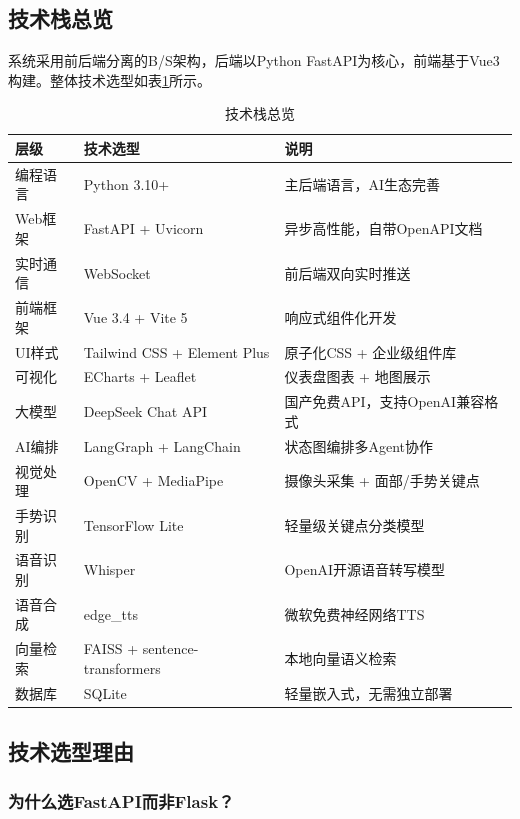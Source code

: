 \documentclass[a4paper]{article}
\begin{document}
\subsection{技术栈总览}

系统采用前后端分离的B/S架构，后端以Python FastAPI为核心，前端基于Vue3构建。整体技术选型如表\ref{tab:techstack}所示。

\begin{table}[H]
  \centering
  \caption{技术栈总览}
  \label{tab:techstack}
  \begin{tabular}{lll}
  \toprule
  层级 & 技术选型 & 说明 \\
  \midrule
  编程语言 & Python 3.10+ & 主后端语言，AI生态完善 \\
  Web框架 & FastAPI + Uvicorn & 异步高性能，自带OpenAPI文档 \\
  实时通信 & WebSocket & 前后端双向实时推送 \\
  前端框架 & Vue 3.4 + Vite 5 & 响应式组件化开发 \\
  UI样式 & Tailwind CSS + Element Plus & 原子化CSS + 企业级组件库 \\
  可视化 & ECharts + Leaflet & 仪表盘图表 + 地图展示 \\
  大模型 & DeepSeek Chat API & 国产免费API，支持OpenAI兼容格式 \\
  AI编排 & LangGraph + LangChain & 状态图编排多Agent协作 \\
  视觉处理 & OpenCV + MediaPipe & 摄像头采集 + 面部/手势关键点 \\
  手势识别 & TensorFlow Lite & 轻量级关键点分类模型 \\
  语音识别 & Whisper & OpenAI开源语音转写模型 \\
  语音合成 & edge\_tts & 微软免费神经网络TTS \\
  向量检索 & FAISS + sentence-transformers & 本地向量语义检索 \\
  数据库 & SQLite & 轻量嵌入式，无需独立部署 \\
  \bottomrule
  \end{tabular}
\end{table}

\subsection{技术选型理由}

\subsubsection{为什么选FastAPI而非Flask？}
\end{document}
